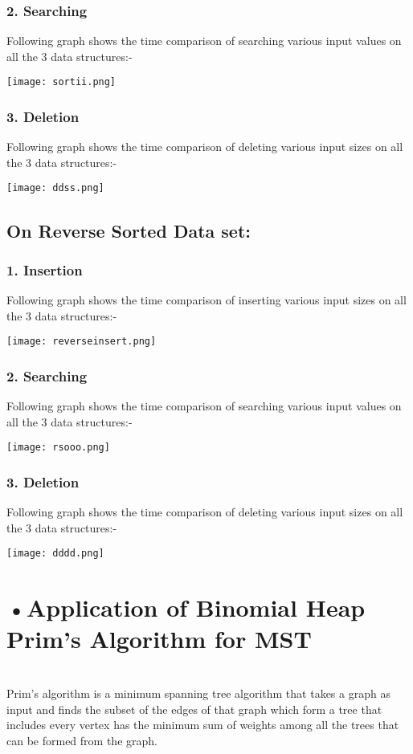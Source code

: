 \documentclass[10pt,a4paper]{article}
\begin{document}
\subsubsection*{2. Searching}

Following graph shows the time comparison of searching various input values on all the 3 data structures:-


\texttt{[image: sortii.png]}  

\subsubsection*{3. Deletion}

Following graph shows the time comparison of deleting various input sizes on all the 3 data structures:-


\texttt{[image: ddss.png]} 

\subsection*{On Reverse Sorted Data set:}

\subsubsection*{1. Insertion}

Following graph shows the time comparison of inserting various input sizes on all the 3 data structures:-
 

\texttt{[image: reverseinsert.png]}  

\subsubsection*{2. Searching}

Following graph shows the time comparison of searching various input values on all the 3 data structures:-


\texttt{[image: rsooo.png]}  

\subsubsection*{3. Deletion}

Following graph shows the time comparison of deleting various input sizes on all the 3 data structures:-


\texttt{[image: dddd.png]} 


\section*{•Application of Binomial Heap \\ Prim's Algorithm for MST} \\
	Prim's algorithm is a minimum spanning tree algorithm that takes a graph as input and finds the subset of the edges of that graph which form a tree that includes every vertex
has the minimum sum of weights among all the trees that can be formed from the graph.\\ \\
\end{document}
